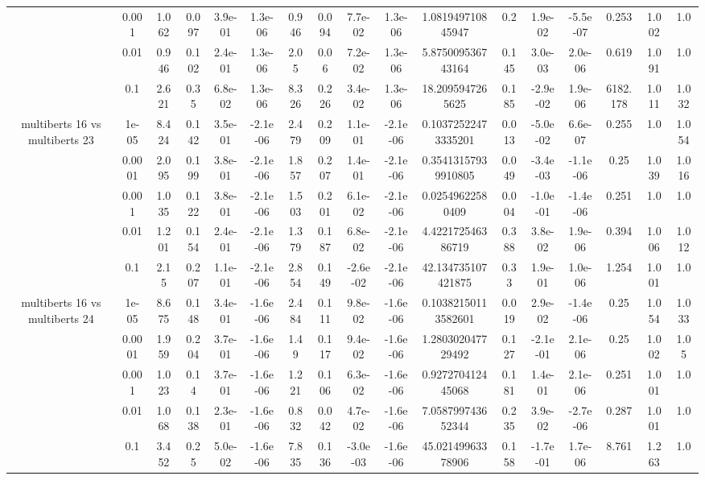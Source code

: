\begin{tabular}{|c|c|c|c|c|c|c|c|c|c|c|c|c|c|c|c|c|}
 & 0.001 & 1.062 & 0.097 & 3.9e-01 & 1.3e-06 & 0.946 & 0.094 & 7.7e-02 & 1.3e-06 & 1.081949710845947 & 0.2 & 1.9e-02 & -5.5e-07 & 0.253 & 1.002 & 1.0 \\
 & 0.01 & 0.946 & 0.102 & 2.4e-01 & 1.3e-06 & 2.05 & 0.06 & 7.2e-02 & 1.3e-06 & 5.875009536743164 & 0.145 & 3.0e-03 & 2.0e-06 & 0.619 & 1.091 & 1.0 \\
 & 0.1 & 2.621 & 0.35 & 6.8e-02 & 1.3e-06 & 8.326 & 0.226 & 3.4e-02 & 1.3e-06 & 18.2095947265625 & 0.185 & -2.9e-02 & 1.9e-06 & 6182.178 & 1.011 & 1.032 \\
\hline
\multirow{5}{*}{multiberts 16 vs multiberts 23} & 1e-05 & 8.424 & 0.142 & 3.5e-01 & -2.1e-06 & 2.479 & 0.209 & 1.1e-01 & -2.1e-06 & 0.10372522473335201 & 0.013 & -5.0e-02 & 6.6e-07 & 0.255 & 1.0 & 1.054 \\
 & 0.0001 & 2.095 & 0.199 & 3.8e-01 & -2.1e-06 & 1.857 & 0.207 & 1.4e-01 & -2.1e-06 & 0.35413157939910805 & 0.049 & -3.4e-03 & -1.1e-06 & 0.25 & 1.039 & 1.016 \\
 & 0.001 & 1.035 & 0.122 & 3.8e-01 & -2.1e-06 & 1.503 & 0.201 & 6.1e-02 & -2.1e-06 & 0.02549622580409 & 0.004 & -1.0e-01 & -1.4e-06 & 0.251 & 1.0 & 1.0 \\
 & 0.01 & 1.201 & 0.154 & 2.4e-01 & -2.1e-06 & 1.379 & 0.187 & 6.8e-02 & -2.1e-06 & 4.422172546386719 & 0.388 & 3.8e-02 & 1.9e-06 & 0.394 & 1.006 & 1.012 \\
 & 0.1 & 2.15 & 0.207 & 1.1e-01 & -2.1e-06 & 2.854 & 0.149 & -2.6e-02 & -2.1e-06 & 42.134735107421875 & 0.33 & 1.9e-01 & 1.0e-06 & 1.254 & 1.001 & 1.0 \\
\hline
\multirow{5}{*}{multiberts 16 vs multiberts 24} & 1e-05 & 8.675 & 0.148 & 3.4e-01 & -1.6e-06 & 2.484 & 0.111 & 9.8e-02 & -1.6e-06 & 0.10382150113582601 & 0.019 & 2.9e-02 & -1.4e-06 & 0.25 & 1.054 & 1.033 \\
 & 0.0001 & 1.959 & 0.204 & 3.7e-01 & -1.6e-06 & 1.49 & 0.117 & 9.4e-02 & -1.6e-06 & 1.280302047729492 & 0.127 & -2.1e-01 & 2.1e-06 & 0.25 & 1.002 & 1.05 \\
 & 0.001 & 1.023 & 0.14 & 3.7e-01 & -1.6e-06 & 1.221 & 0.106 & 6.3e-02 & -1.6e-06 & 0.927270412445068 & 0.181 & 1.4e-01 & 2.1e-06 & 0.251 & 1.001 & 1.0 \\
 & 0.01 & 1.068 & 0.138 & 2.3e-01 & -1.6e-06 & 0.832 & 0.042 & 4.7e-02 & -1.6e-06 & 7.058799743652344 & 0.235 & 3.9e-02 & -2.7e-06 & 0.287 & 1.001 & 1.0 \\
 & 0.1 & 3.452 & 0.25 & 5.0e-02 & -1.6e-06 & 7.835 & 0.136 & -3.0e-03 & -1.6e-06 & 45.02149963378906 & 0.158 & -1.7e-01 & 1.7e-06 & 8.761 & 1.263 & 1.0 \\

\end{tabular}
